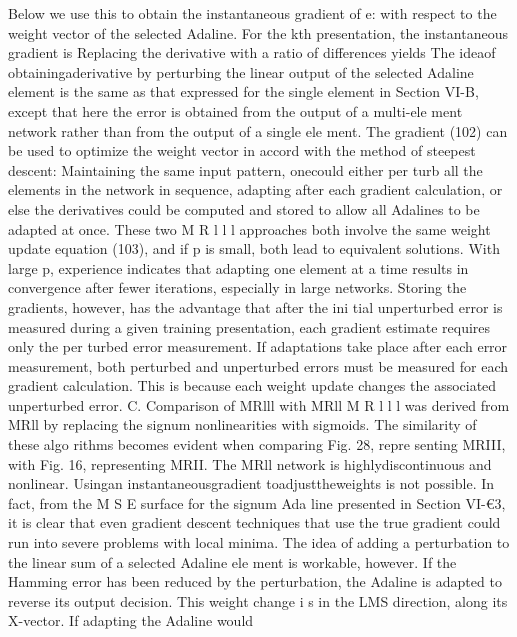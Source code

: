 \documentclass[11pt,a4paper,twocolumn]{article}
\begin{document}
{{\newpage


Below we use this to obtain the instantaneous gradient of 
e: with respect to the weight vector of the selected Adaline. 
For the kth presentation, the instantaneous gradient is 
Replacing the derivative with a ratio of differences yields 
The ideaof obtainingaderivative by perturbing the linear 
output of the selected Adaline element is the same as that 
expressed for the single element in Section VI-B, except that 
here the error is obtained from the output of a multi-ele
ment network rather than from the output of a single ele
ment. 
The gradient (102) can be used to optimize the weight 
vector in accord with the method of steepest descent: 
Maintaining the same input pattern, onecould either per
turb all the elements in the network in sequence, adapting 
after each gradient calculation, or else the derivatives could 
be computed and stored to allow all Adalines to be adapted 
at once. These two M R l l l  approaches both involve the same 
weight update equation (103), and if p is small, both lead 
to equivalent solutions. With large p, experience indicates 
that adapting one element at a time results in convergence 
after fewer iterations, especially in large networks. Storing 
the gradients, however, has the advantage that after the ini
tial unperturbed error is measured during a given training 
presentation, each gradient estimate requires only the per
turbed error measurement. If adaptations take place after 
each error measurement, both perturbed and unperturbed 
errors must be measured for each gradient calculation. This 
is because each weight update changes the associated 
unperturbed error. 
C. Comparison of MRlll with MRll 
M R l l l  was derived from MRll by replacing the signum 
nonlinearities with sigmoids. The similarity of these algo
rithms becomes evident when comparing Fig. 28, repre
senting MRIII, with Fig. 16, representing MRII. 
The MRll network is highlydiscontinuous and nonlinear. 
Usingan instantaneousgradient toadjusttheweights is not 
possible. In fact, from the M S E  surface for the signum Ada
line presented in Section VI-€3, it is clear that even gradient 
descent techniques that use the true gradient could run 
into severe problems with local minima. The idea of adding 
a perturbation to the linear sum of a selected Adaline ele
ment is workable, however. If the Hamming error has been 
reduced by the perturbation, the Adaline is adapted to 
reverse its output decision. This weight change i s  in the LMS 
direction, along its X-vector. If adapting the Adaline would 
}}
\end{document}
